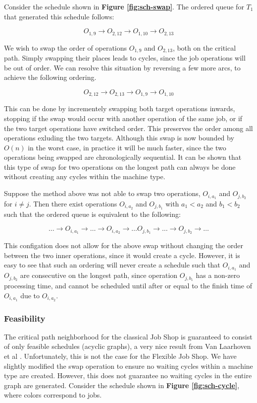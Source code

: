 \documentclass[a4paper,11pt]{article}
\begin{document}
Consider the schedule shown in \textbf{Figure \ref{fig:sch-swap}}. The ordered queue for $T_1$ that generated this schedule follows:

\[ O_{1,9} \rightarrow O_{2,12} \rightarrow O_{1,10} \rightarrow O_{2,13} \]

We wish to swap the order of operations $O_{1,9}$ and $O_{2,13}$, both on the critical path. Simply swapping their places leads to cycles, since the job operations will be out of order. We can resolve this situation by reversing a few more arcs, to achieve the following ordering.

\[ O_{2,12} \rightarrow O_{2,13} \rightarrow O_{1,9} \rightarrow O_{1,10} \]

This can be done by incrementely swapping both target operations inwards, stopping if the swap would occur with another operation of the same job, or if the two target operations have switched order. This preserves the order among all operations exluding the two targets. Although this swap is now bounded by $O(n)$ in the worst case, in practice it will be much faster, since the two operations being swapped are chronologically sequential. It can be shown that this type of swap for two operations on the longest path can always be done without creating any cycles within the machine type.

Suppose the method above was not able to swap two operations, $O_{i,a_1}$ and $O_{j,b_2}$ for $i \neq j$. Then there exist operations $O_{i,a_2}$ and $O_{j,b_1}$ with $a_1 < a_2$ and $b_1 < b_2$ such that the ordered queue is equivalent to the following:

\[ \dots \rightarrow O_{i,a_1} \rightarrow \dots \rightarrow O_{i,a_2} \rightarrow \dots O_{j,b_1}
\rightarrow \dots \rightarrow O_{j,b_2} \rightarrow \dots \]

This configation does not allow for the above swap without changing the order between the two inner operations, since it would create a cycle. However, it is easy to see that such an ordering will never create a schedule such that $O_{i,a_1}$ and $O_{j,b_2}$ are consecutive on the longest path, since operation $O_{j,b_1}$ has a non-zero processing time, and cannot be scheduled until after or equal to the finish time of $O_{i,a_1}$ due to $O_{i,a_2}$.

\subsubsection{Feasibility}

The critical path neighborhood for the classical Job Shop is guaranteed to consist of only feasible schedules (acyclic graphs), a very nice result from Van Laarhoven et al \cite{simulatedannealingjsp}. Unfortunately, this is not the case for the Flexible Job Shop. We have slightly modified the swap operation to ensure no waiting cycles within a machine type are created. However, this does not guarantee no waiting cycles in the entire graph are generated. Consider the schedule shown in \textbf{Figure \ref{fig:sch-cycle}}, where colors correspond to jobs.
\end{document}
